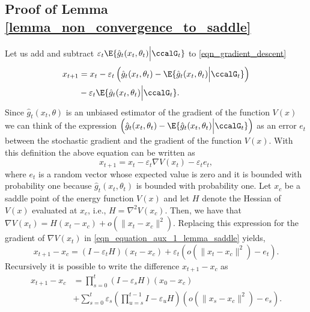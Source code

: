 \documentclass[article]{IEEEtran}
\theoremstyle{definition}
\begin{document}
\subsection{Proof of Lemma \ref{lemma_non_convergence_to_saddle}}\label{ap_non_convergence_to_saddle}
%
Let us add and subtract $\varepsilon_t\E{\hat{g}_t(x_t,\theta_t) \Big| \ccalG_t}$ to \eqref{eqn_gradient_descent} 
%
\begin{equation}
\begin{split}
x_{t+1} &= x_t -\varepsilon_t\left(\hat{g}_t(x_t,\theta_t)-\E{\hat{g}_t(x_t,\theta_t) \Big| \ccalG_t}\right) \\
&-\varepsilon_t\E{\hat{g}_t(x_t,\theta_t) \Big| \ccalG_t}.
\end{split}
\end{equation} 
%
Since $\hat{g}_t(x_t,\theta)$ is an unbiased estimator of the gradient of the function $V(x)$ we can think of the expression $\left(\hat{g}_t(x_t,\theta_t)-\E{\hat{g}_t(x_t,\theta_t) \Big| \ccalG_t}\right)$ as an error $e_t$ between the stochastic gradient and the gradient of the function $V(x)$. With this definition the above equation can be written as
%
\begin{equation}\label{eqn_equation_aux_1_lemma_saddle}
x_{t+1} = x_t -\varepsilon_t\nabla V(x_t) -\varepsilon_te_t, 
\end{equation}
%
where $e_t$ is a random vector whose expected value is zero and it is bounded with probability one because $\hat{g}_t(x_t,\theta_t)$ is bounded with probability one. Let $x_c$ be a saddle point of the energy function $V(x)$ and let $H$ denote the Hessian of $V(x)$ evaluated at $x_c$, i.e., $H= \nabla^2 V(x_c)$. Then, we have that $\nabla V(x_t) = H(x_t-x_c) + o(\|x_t-x_c\|^2)$. Replacing this expression for the gradient of $\nabla V(x_t)$ in \eqref{eqn_equation_aux_1_lemma_saddle} yields,
%
\begin{equation}\label{eqn_key_in_saddle_point_lemma}
x_{t+1} -x_c= (I-\varepsilon_tH)(x_t -x_c) +\varepsilon_t\left(o(\|x_t-x_c\|^2) -e_t\right).
\end{equation}
%
Recursively it is possible to write the difference $x_{t+1} - x_c$ as
%
\begin{equation}
\begin{split}
x_{t+1} - x_c &= \prod_{s=0}^t (I-\varepsilon_sH) (x_0-x_c)\\
&+\sum_{s=0}^t\varepsilon_s\left(\prod_{u=s}^{t-1} I -\varepsilon_u  H\right)\left( o(\|x_s-x_{c}\|^2) -e_s\right).
\end{split}
\end{equation}
\end{document}
